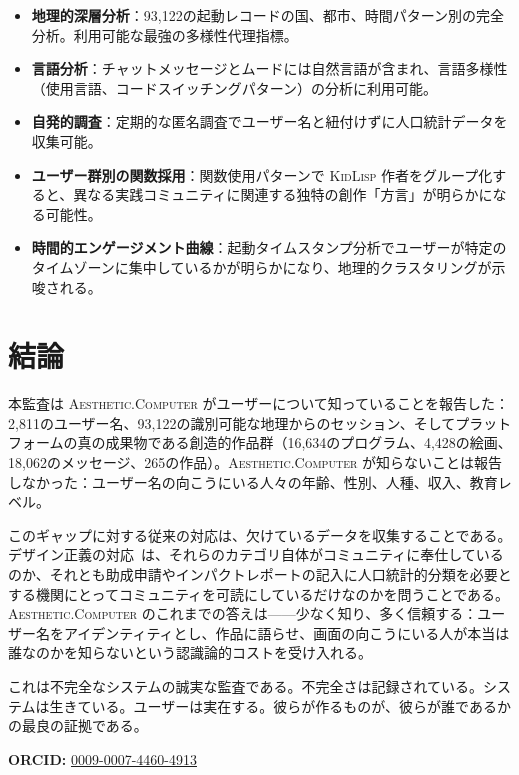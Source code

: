 \documentclass[10pt,letterpaper,twocolumn]{article}
\newcommand{\ac}{\textsc{Aesthetic.Computer}}
\newcommand{\kl}{\textsc{KidLisp}}
\begin{document}
\begin{itemize}
  \item \textbf{地理的深層分析}：93,122の起動レコードの国、都市、時間パターン別の完全分析。利用可能な最強の多様性代理指標。
  \item \textbf{言語分析}：チャットメッセージとムードには自然言語が含まれ、言語多様性（使用言語、コードスイッチングパターン）の分析に利用可能。
  \item \textbf{自発的調査}：定期的な匿名調査でユーザー名と紐付けずに人口統計データを収集可能。
  \item \textbf{ユーザー群別の関数採用}：関数使用パターンで \kl{} 作者をグループ化すると、異なる実践コミュニティに関連する独特の創作「方言」が明らかになる可能性。
  \item \textbf{時間的エンゲージメント曲線}：起動タイムスタンプ分析でユーザーが特定のタイムゾーンに集中しているかが明らかになり、地理的クラスタリングが示唆される。
\end{itemize}

\section{結論}

本監査は \ac{} がユーザーについて知っていることを報告した：2,811のユーザー名、93,122の識別可能な地理からのセッション、そしてプラットフォームの真の成果物である創造的作品群（16,634のプログラム、4,428の絵画、18,062のメッセージ、265の作品）。\ac{} が知らないことは報告しなかった：ユーザー名の向こうにいる人々の年齢、性別、人種、収入、教育レベル。

このギャップに対する従来の対応は、欠けているデータを収集することである。デザイン正義の対応~\citep{costanzachock2020design}は、それらのカテゴリ自体がコミュニティに奉仕しているのか、それとも助成申請やインパクトレポートの記入に人口統計的分類を必要とする機関にとってコミュニティを可読にしているだけなのかを問うことである。\ac{} のこれまでの答えは——少なく知り、多く信頼する：ユーザー名をアイデンティティとし、作品に語らせ、画面の向こうにいる人が本当は誰なのかを知らないという認識論的コストを受け入れる。

これは不完全なシステムの誠実な監査である。不完全さは記録されている。システムは生きている。ユーザーは実在する。彼らが作るものが、彼らが誰であるかの最良の証拠である。

\vspace{0.5em}
\noindent\textbf{ORCID:} \href{https://orcid.org/0009-0007-4460-4913}{0009-0007-4460-4913}



\end{document}
